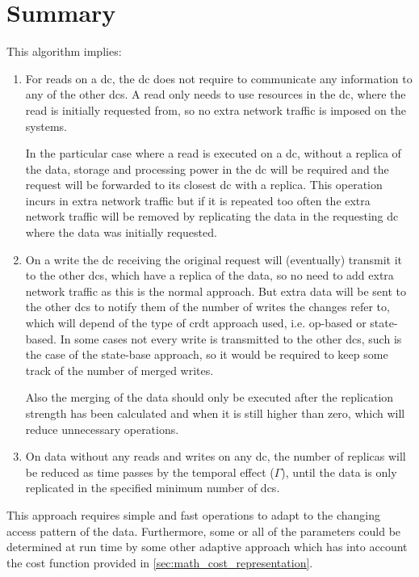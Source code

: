 \documentclass[english]{article}
\begin{document}
\section{Summary}
This algorithm implies:
\begin{enumerate}
	\item For reads on a \gls{dc}, the \gls{dc} does not require to communicate any information to any of the other \glspl{dc}. A read only needs to use resources in the \gls{dc}, where the read is initially requested from, so no extra network traffic is imposed on the systems.
	
	In the particular case where a read is executed on a \gls{dc}, without a replica of the data, storage and processing power in the \gls{dc} will be required and the request will be forwarded to its closest \gls{dc} with a replica. This operation incurs in extra network traffic but if it is repeated too often the extra network traffic will be removed by replicating the data in the requesting \gls{dc} where the data was initially requested.
	
	\item On a write the \gls{dc} receiving the original request will (eventually) transmit it to the other \glspl{dc}, which have a replica of the data, so no need to add extra network traffic as this is the normal approach. But extra data will be sent to the other \glspl{dc} to notify them of the number of writes the changes refer to, which will depend of the type of \gls{crdt} approach used, i.e. op-based or state-based. In some cases not every write is transmitted to the other \glspl{dc}, such is the case of the state-base approach, so it would be required to keep some track of the number of merged writes.
	
	Also the merging of the data should only be executed after the replication strength has been calculated and when it is still higher than zero, which will reduce unnecessary operations.

	\item On data without any reads and writes on any \gls{dc}, the number of replicas will be reduced as time passes by the temporal effect ($\Gamma$), until the data is only replicated in the specified minimum number of \glspl{dc}.
\end{enumerate}

This approach requires simple and fast operations to adapt to the changing access pattern of the data. Furthermore, some or all of the parameters could be determined at run time by some other adaptive approach which has into account the cost function provided in \ref{sec:math_cost_representation}.
\end{document}
